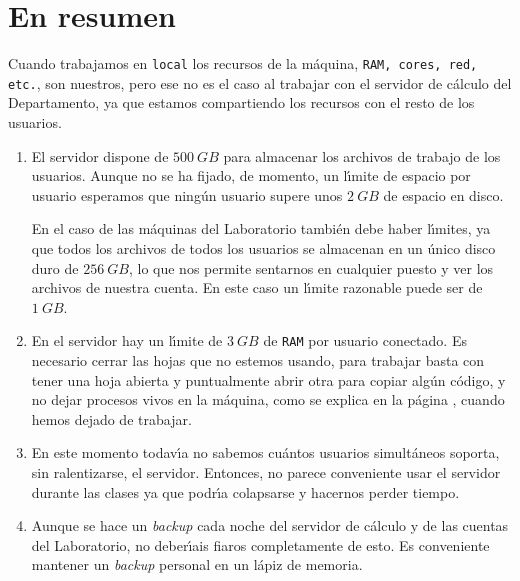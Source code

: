 \section{En resumen}
Cuando trabajamos en {\tt local}  los recursos de la m\'aquina, {\tt RAM, cores, red, etc.},  son nuestros, pero ese no es el caso al trabajar con el servidor de c\'alculo del Departamento, ya que estamos compartiendo los recursos con el resto de los usuarios.
\begin{enumerate}
	\item El servidor dispone de $500\ GB$ para almacenar los archivos de trabajo de los usuarios. Aunque no se ha fijado, de momento,  un l\'{\i}mite de espacio por usuario esperamos que ning\'un usuario supere unos $2\ GB$ de espacio en disco.
	
	En el caso de las m\'aquinas del Laboratorio tambi\'en debe haber l\'{\i}mites, ya que todos los archivos de todos los usuarios se almacenan en un \'unico disco duro de $256\ GB$, lo que nos permite sentarnos en cualquier puesto y ver los archivos de nuestra cuenta. En este caso un l\'{\i}mite razonable puede ser de $1\ GB$. 
	
	\item En el servidor hay un l\'{\i}mite de $3\ GB$ de {\tt RAM} por usuario conectado. Es {\sc necesario} cerrar las hojas que no estemos usando, para trabajar basta con tener una hoja abierta y puntualmente abrir otra para copiar alg\'un c\'odigo, y no dejar procesos vivos en la m\'aquina, como se explica  en la p\'agina \pageref{cerrar}, cuando hemos dejado de trabajar.  
	
	\item En este momento todav\'{\i}a no sabemos cu\'antos usuarios simult\'aneos soporta, sin ralentizarse, el servidor. Entonces, no parece conveniente usar el servidor durante las clases ya que podr\'{\i}a colapsarse y hacernos perder tiempo. 
	
	\item Aunque se hace un {\itshape backup} cada noche del servidor de c\'alculo y de las cuentas del Laboratorio, no deber\'{\i}ais fiaros completamente de esto. Es conveniente mantener un {\itshape backup} personal en un l\'apiz de memoria.
	
	
	
\end{enumerate}



